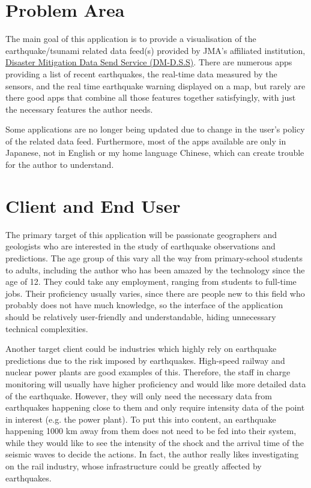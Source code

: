 \section{Problem Area}
The main goal of this application is to provide a visualisation of the earthquake/tsunami related data feed(s) provided by JMA's affiliated institution, \href{https://dmdata.jp}{Disaster Mitigation Data Send Service (DM-D.S.S)}. There are numerous apps providing a list of recent earthquakes, the real-time data measured by the sensors, and the real time earthquake warning displayed on a map, but rarely are there good apps that combine all those features together satisfyingly, with just the necessary features the author needs.

Some applications are no longer being updated due to change in the user's policy of the related data feed. Furthermore, most of the apps available are only in Japanese, not in English or my home language Chinese, which can create trouble for the author to understand.

\section{Client and End User}
The primary target of this application will be passionate geographers and geologists who are interested in the study of earthquake observations and predictions. The age group of this vary all the way from primary-school students to adults, including the author who has been amazed by the technology since the age of 12. They could take any employment, ranging from students to full-time jobs. Their proficiency usually varies, since there are people new to this field who probably does not have much knowledge, so the interface of the application should be relatively user-friendly and understandable, hiding unnecessary technical complexities.

Another target client could be industries which highly rely on earthquake predictions due to the risk imposed by earthquakes. High-speed railway and nuclear power plants are good examples of this. Therefore, the staff in charge monitoring will usually have higher proficiency and would like more detailed data of the earthquake. However, they will only need the necessary data from earthquakes happening close to them and only require intensity data of the point in interest (e.g. the power plant). To put this into content, an earthquake happening 1000 km away from them does not need to be fed into their system, while they would like to see the intensity of the shock and the arrival time of the seismic waves to decide the actions. In fact, the author really likes investigating on the rail industry, whose infrastructure could be greatly affected by earthquakes.

